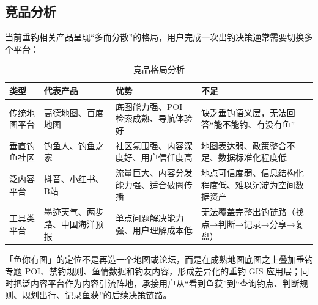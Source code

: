 \subsection{竞品分析}

当前垂钓相关产品呈现“多而分散”的格局，用户完成一次出钓决策通常需要切换多个平台：

\begin{table}[H]
  \centering
  \caption{竞品格局分析}
  \label{tab:competitors}
  \begin{tabularx}{\textwidth}{p{2.5cm}|p{4cm}|p{4cm}|p{4.5cm}}
    \toprule
    \textbf{类型} & \textbf{代表产品} & \textbf{优势} & \textbf{不足} \\
    \midrule
    传统地图平台 & 高德地图、百度地图 & 底图能力强、POI 检索成熟、导航体验好 & 缺乏垂钓语义层，无法回答“能不能钓、有没有鱼” \\
    \hline
    垂直钓鱼社区 & 钓鱼人、钓鱼之家 & 社区氛围强、内容深度好、用户信任度高 & 地图表达弱、政策整合不足、数据标准化程度低 \\
    \hline
    泛内容平台 & 抖音、小红书、B站 & 流量巨大、内容分发能力强、适合破圈传播 & 地点可信度弱、信息结构化程度低、难以沉淀为空间数据资产 \\
    \hline
    工具类平台 & 墨迹天气、两步路、中国海洋预报 & 单点问题解决能力强、用户理解成本低 & 无法覆盖完整出钓链路（找点→判断→记录→分享→复盘） \\
    \bottomrule
  \end{tabularx}
\end{table}

「鱼你有图」的定位不是再造一个地图或论坛，而是在成熟地图底图之上叠加垂钓专题 POI、禁钓规则、鱼情数据和钓友内容，形成差异化的垂钓 GIS 应用层；同时把泛内容平台作为内容引流阵地，承接用户从“看到鱼获”到“查询钓点、判断规则、规划出行、记录鱼获”的后续决策链路。

